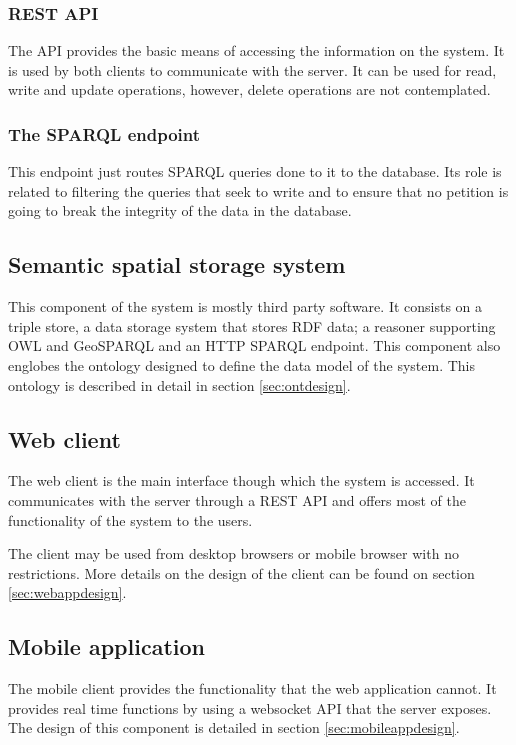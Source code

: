 \subsubsection*{REST API}

The API provides the basic means of accessing the information on the system. It is used by both clients to communicate with the server. It can be used for read, write and update operations, however, delete operations are not contemplated.

\subsubsection*{The SPARQL endpoint}

This endpoint just routes SPARQL queries done to it to the database. Its role is related to filtering the queries that seek to write and to ensure that no petition is going to break the integrity of the data in the database.

\subsection{Semantic spatial storage system}

This component of the system is mostly third party software. It consists on a triple store, a data storage system that stores RDF data; a reasoner supporting OWL and GeoSPARQL and an HTTP SPARQL endpoint. This component also englobes the ontology designed to define the data model of the system. This ontology is described in detail in section \ref{sec:ontdesign}.

\subsection{Web client}

The web client is the main interface though which the system is accessed. It communicates with the server through a REST API and offers most of the functionality of the system to the users.

The client may be used from desktop browsers or mobile browser with no restrictions. More details on the design of the client can be found on section \ref{sec:webappdesign}.

\subsection{Mobile application}

The mobile client provides the functionality that the web application cannot. It provides real time functions by using a websocket API that the server exposes. The design of this component is detailed in section \ref{sec:mobileappdesign}.

